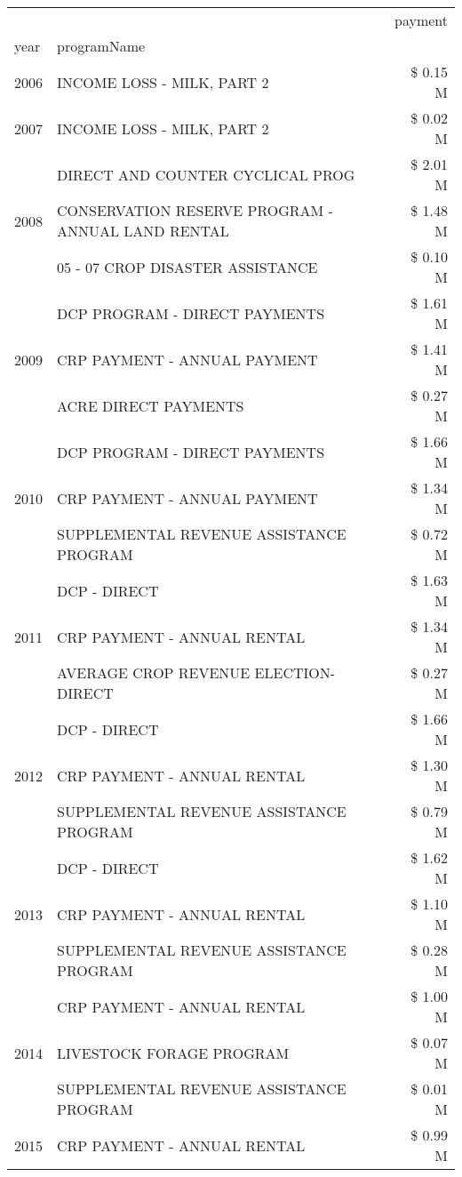 \begin{tabular}{llr}
\toprule
 &  & payment \\
year & programName &  \\
\midrule
2006 & INCOME LOSS - MILK, PART 2 & \$ 0.15 M \\
\cline{1-3}
2007 & INCOME LOSS - MILK, PART 2 & \$ 0.02 M \\
\cline{1-3}
\multirow[t]{3}{*}{2008} & DIRECT AND COUNTER CYCLICAL PROG & \$ 2.01 M \\
 & CONSERVATION RESERVE PROGRAM - ANNUAL LAND RENTAL & \$ 1.48 M \\
 & 05 - 07 CROP DISASTER ASSISTANCE & \$ 0.10 M \\
\cline{1-3}
\multirow[t]{3}{*}{2009} & DCP PROGRAM - DIRECT PAYMENTS & \$ 1.61 M \\
 & CRP PAYMENT - ANNUAL PAYMENT & \$ 1.41 M \\
 & ACRE DIRECT PAYMENTS & \$ 0.27 M \\
\cline{1-3}
\multirow[t]{3}{*}{2010} & DCP PROGRAM - DIRECT PAYMENTS & \$ 1.66 M \\
 & CRP PAYMENT - ANNUAL PAYMENT & \$ 1.34 M \\
 & SUPPLEMENTAL REVENUE ASSISTANCE PROGRAM & \$ 0.72 M \\
\cline{1-3}
\multirow[t]{3}{*}{2011} & DCP - DIRECT & \$ 1.63 M \\
 & CRP PAYMENT - ANNUAL RENTAL & \$ 1.34 M \\
 & AVERAGE CROP REVENUE ELECTION-DIRECT & \$ 0.27 M \\
\cline{1-3}
\multirow[t]{3}{*}{2012} & DCP - DIRECT & \$ 1.66 M \\
 & CRP PAYMENT - ANNUAL RENTAL & \$ 1.30 M \\
 & SUPPLEMENTAL REVENUE ASSISTANCE PROGRAM & \$ 0.79 M \\
\cline{1-3}
\multirow[t]{3}{*}{2013} & DCP - DIRECT & \$ 1.62 M \\
 & CRP PAYMENT - ANNUAL RENTAL & \$ 1.10 M \\
 & SUPPLEMENTAL REVENUE ASSISTANCE PROGRAM & \$ 0.28 M \\
\cline{1-3}
\multirow[t]{3}{*}{2014} & CRP PAYMENT - ANNUAL RENTAL & \$ 1.00 M \\
 & LIVESTOCK FORAGE PROGRAM & \$ 0.07 M \\
 & SUPPLEMENTAL REVENUE ASSISTANCE PROGRAM & \$ 0.01 M \\
\cline{1-3}
\multirow[t]{2}{*}{2015} & CRP PAYMENT - ANNUAL RENTAL & \$ 0.99 M \\

\end{tabular}
